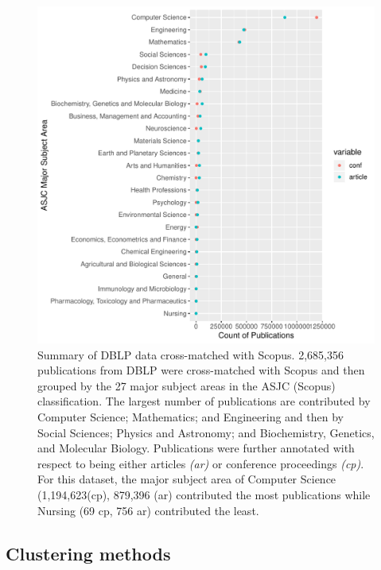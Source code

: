  \begin{figure}[ht]
\centering
  \includegraphics[scale=0.5]{ar_cp_ratio.pdf}
\caption{Summary of DBLP data cross-matched with Scopus. 2,685,356 publications from DBLP were cross-matched with Scopus and then grouped by the 27 major subject areas in the ASJC (Scopus) classification. The largest number of publications are contributed by Computer Science; Mathematics; and Engineering and then by Social Sciences; Physics and Astronomy; and Biochemistry, Genetics, and Molecular Biology. Publications were further annotated with respect to being either articles \emph{(ar)} or conference proceedings \emph{(cp)}. For this dataset, the major subject area of Computer Science (1,194,623(cp), 879,396 (ar) contributed the most publications while Nursing (69 cp,  756 ar) contributed the least.}
\label{fig:ar_cp_annotation}       %
\end{figure}

\subsection{Clustering methods}

